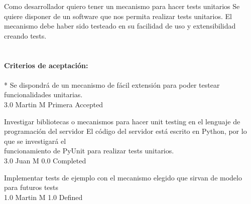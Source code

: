 \vspace{20pt}

	{Como desarrollador quiero tener un mecanismo para hacer tests unitarios} %
	{Se quiere disponer de un software que nos permita realizar tests unitarios. El\\
mecanismo debe haber sido testeado en su facilidad de uso y extensibilidad\\
creando tests.\\
  \\
  \\
\textbf{Criterios de aceptación:}\\
  \\
* Se dispondrá de un mecanismo de fácil extensión para poder testear funcionalidades unitarias. \\
} %
	{} %
	{3.0} %
	{Martin M} %
	{Primera} %
	{Accepted} %

		{Investigar bibliotecas o mecanismos para hacer unit testing en el lenguaje de programación del servidor} %
		{El código del servidor está escrito en Python, por lo que se investigará el\\
funcionamiento de PyUnit para realizar tests unitarios.\\
} %
		{3.0} %
		{Juan M} %
		{0.0} %
		{Completed} %

		{Implementar tests de ejemplo con el mecanismo elegido que sirvan de modelo para futuros tests} %
		{\\
} %
		{1.0} %
		{Martin M} %
		{1.0} %
		{Defined} %


\vspace{20pt}

